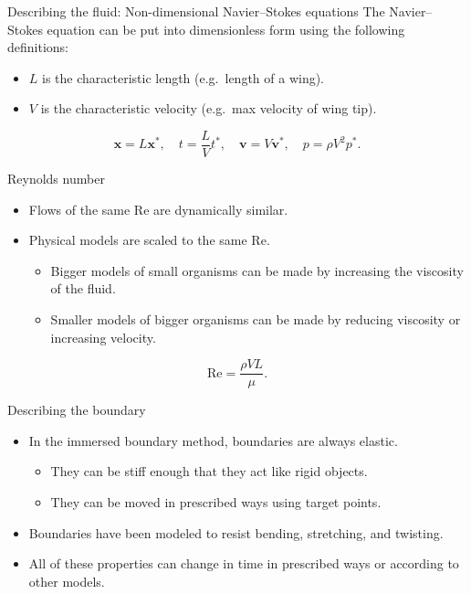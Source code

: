\documentclass{beamer}
\begin{document}
\begin{frame}{Describing the fluid: Non-dimensional Navier--Stokes equations}
\small
The Navier--Stokes equation can be put into dimensionless form using the following definitions:
\begin{itemize}
    \item $L$ is the characteristic length (e.g.\ length of a wing).
    \item $V$ is the characteristic velocity (e.g.\ max velocity of wing tip).
\end{itemize}

\medskip
\[
\mathbf{x}=L\mathbf{x}^\ast,\quad t=\frac{L}{V}t^\ast,\quad \mathbf{v}=V\mathbf{v}^\ast,\quad p=\rho V^2 p^\ast.
\]
\end{frame}

\begin{frame}{Reynolds number}
\small
\begin{itemize}
    \item Flows of the same $\mathrm{Re}$ are dynamically similar.
    \item Physical models are scaled to the same $\mathrm{Re}$.
    \begin{itemize}
        \item Bigger models of small organisms can be made by increasing the viscosity of the fluid.
        \item Smaller models of bigger organisms can be made by reducing viscosity or increasing velocity.
    \end{itemize}
\end{itemize}

\medskip
\[
\mathrm{Re}=\frac{\rho V L}{\mu}.
\]
\end{frame}

\begin{frame}{Describing the boundary}
\small
\begin{itemize}
    \item In the immersed boundary method, boundaries are always elastic.
    \begin{itemize}
        \item They can be stiff enough that they act like rigid objects.
        \item They can be moved in prescribed ways using target points.
    \end{itemize}
    \item Boundaries have been modeled to resist bending, stretching, and twisting.
    \item All of these properties can change in time in prescribed ways or according to other models.
\end{itemize}
\end{frame}
\end{document}
